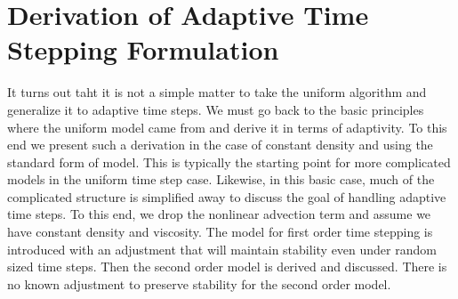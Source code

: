 \documentclass[letterpaper]{erdc}
\begin{document}
\section{Derivation of Adaptive Time Stepping Formulation}
It turns out taht it is not a simple matter to take the uniform algorithm and generalize it to adaptive time steps.  We must go back to the basic principles where the uniform model came from and derive it in terms of adaptivity.  To this end we present such a derivation in the case of constant density and using the standard form of model.  This is typically the starting point for more complicated models in the uniform time step case.  Likewise, in this basic case, much of the complicated structure is simplified away to discuss the goal of handling adaptive time steps.  To this end, we drop the nonlinear advection term and assume we have constant density and viscosity.  The model for first order time stepping is introduced with an adjustment that will maintain stability even under random sized time steps.  Then the second order model is derived and discussed.  There is no known adjustment to preserve stability for the second order model.


%
%
\end{document}

